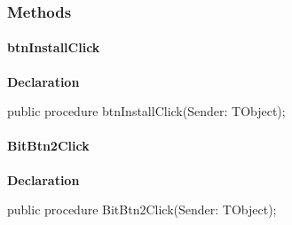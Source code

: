 \documentclass{report}
\newif\ifpdf
\begin{document}
\subsubsection*{\large{\textbf{Methods}}\normalsize\hspace{1ex}\hfill}
\paragraph*{btnInstallClick}\hspace*{\fill}

\label{manager.TMnFrm-btnInstallClick}
\begin{list}{}{
\setlength{\itemindent}{0cm}
\setlength{\listparindent}{0cm}
\setlength{\leftmargin}{\evensidemargin}
\addtolength{\leftmargin}{\tmplength}
\settowidth{\labelsep}{X}
\addtolength{\leftmargin}{\labelsep}
\setlength{\labelwidth}{\tmplength}
}
\item[\textbf{Declaration}\hfill]
\ifpdf
\begin{flushleft}
\fi
\begin{ttfamily}
public procedure btnInstallClick(Sender: TObject);\end{ttfamily}

\ifpdf
\end{flushleft}
\fi

\end{list}
\paragraph*{BitBtn2Click}\hspace*{\fill}

\label{manager.TMnFrm-BitBtn2Click}
\begin{list}{}{
\setlength{\itemindent}{0cm}
\setlength{\listparindent}{0cm}
\setlength{\leftmargin}{\evensidemargin}
\addtolength{\leftmargin}{\tmplength}
\settowidth{\labelsep}{X}
\addtolength{\leftmargin}{\labelsep}
\setlength{\labelwidth}{\tmplength}
}
\item[\textbf{Declaration}\hfill]
\ifpdf
\begin{flushleft}
\fi
\begin{ttfamily}
public procedure BitBtn2Click(Sender: TObject);\end{ttfamily}

\ifpdf
\end{flushleft}
\fi

\end{list}
\end{document}
